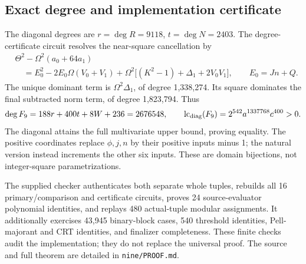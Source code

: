 \subsection{Exact degree and implementation certificate}
The diagonal degrees are \(r=\deg R=9118\), \(t=\deg N=2403\).
The degree-certificate circuit resolves the near-square cancellation by
\begin{align*}
 &\Theta^2-\Omega^2(a_0+64a_1)\\
 &\quad=E_0^2-2E_0\Omega(V_0+V_1)
 +\Omega^2\bigl[(K^2-1)+\Delta_1+2V_0V_1\bigr],
 \qquad E_0=Jn+Q.
\end{align*}
The unique dominant term is \(\Omega^2\Delta_1\), of degree 1,338,274.
Its square dominates the final subtracted norm term, of degree 1,823,794.
Thus
\[
 \deg F_9=188r+400t+8W+236=2676548,
 \qquad \operatorname{lc}_{\rm diag}(F_9)
 =2^{542}a^{1337768}c^{400}>0.
\]
The diagonal attains the full multivariate upper bound, proving equality.
The positive coordinates replace \(\phi,j,n\) by their positive inputs
minus 1; the natural version instead increments the other six inputs.
These are domain bijections, not integer-square parametrizations.

The supplied checker authenticates both separate whole tuples, rebuilds all
16 primary/comparison and certificate circuits, proves 24 source-evaluator
polynomial identities, and replays 480 actual-tuple modular assignments.
It additionally exercises 43,945 binary-block cases, 540 threshold identities,
Pell-majorant and CRT identities, and finalizer completeness.  These finite
checks audit the implementation; they do not replace the universal proof.
The source and full theorem are detailed in \texttt{nine/PROOF.md}.
